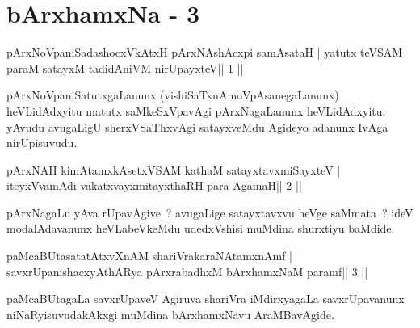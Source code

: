 \chapter{bArxhamxNa - 3}



\begin{shl}
pArxNoVpaniSadashocxVkAtxH pArxNAshAcxpi samAsataH |
yatutx teVSAM paraM satayxM tadidAniVM nirUpayxteV\hfill || 1 ||
\end{shl}

\begin{artha}
pArxNoVpaniSatutxgaLanunx (vishiSaTxnAmoVpAsanegaLanunx) heVLidAdxyitu matutx saMkeSxVpavAgi pArxNagaLanunx heVLidAdxyitu. yAvudu avugaLigU sherxVSaThxvAgi satayxveMdu Agideyo adanunx IvAga nirUpisuvudu.
\end{artha}

\begin{shl}
pArxNAH kimAtamxkAsetxVSAM kathaM satayxtavxmiSayxteV |
iteyxVvamAdi vakatxvayxmitayxthaRH para AgamaH\hfill || 2 ||
\end{shl}

\begin{artha}
pArxNagaLu yAva rUpavAgive~? avugaLige satayxtavxvu heVge saMmata~? ideV modalAdavanunx heVLabeVkeMdu udedxVshisi muMdina shurxtiyu baMdide.
\end{artha}



\begin{shl}
paMcaBUtasatatAtxvXnAM shariVrakaraNAtamxnAmf |
savxrUpanishacxyAthARya pArxrabadhxM bArxhamxNaM paramf\hfill || 3 ||
\end{shl}

\begin{artha}
paMcaBUtagaLa savxrUpaveV Agiruva shariVra iMdirxyagaLa savxrUpavanunx niNaRyisuvudakAkxgi muMdina bArxhamxNavu AraMBavAgide.
\end{artha}




